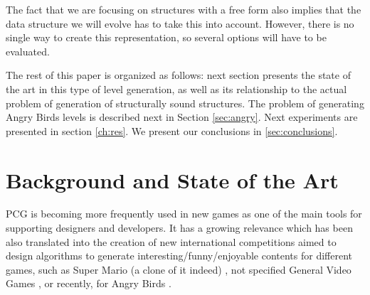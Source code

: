 \documentclass[sigconf]{acmart}
\begin{document}
The fact that we are focusing on structures with a free form also
implies that the data structure we will evolve has to take this into
account. However, there is no single way to create this representation,
 so several options will have to be evaluated. 



 

The rest of this paper is organized as follows: next section presents
the state of the art in this type of level generation, as well as its
relationship to the actual problem of generation of structurally sound
structures. The problem of generating Angry Birds levels is described
next in Section \ref{sec:angry}. Next experiments are presented in
section \ref{ch:res}. We present our conclusions in \ref{sec:conclusions}.


\section{Background and State of the Art}
\label{sec:soa}

PCG is becoming more frequently used in new games as one of the main
tools for supporting designers and developers. It has a growing
relevance which has been also translated into the creation of new
international competitions aimed to design algorithms to generate
interesting/funny/enjoyable contents for different games, such as
Super Mario (a clone of it indeed) \cite{MarioAI_Level_12}, not
specified General Video Games
\cite{GAIG_LevelGeneration_18,Khalifa_GVGLG_16}, or recently, for
Angry Birds \cite{AngryBirds_LevelGeneration_18}. 
\end{document}
